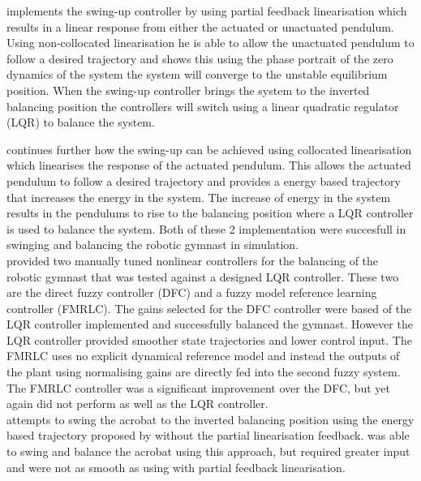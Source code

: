 \citet{spong_swingup} implements the swing-up controller by using partial feedback linearisation which results in a linear response from either the actuated or unactuated pendulum. Using non-collocated linearisation he is able to allow the unactuated pendulum to follow a desired trajectory and shows this using the phase portrait of the zero dynamics of the system the system will converge to the unstable equilibrium position. When the swing-up controller brings the system to the inverted balancing position the controllers will switch using a linear quadratic regulator (LQR) to balance the system.

\citet{spong_swingup} continues further how the swing-up can be achieved using collocated linearisation which linearises the response of the actuated pendulum. This allows the actuated pendulum to follow a desired trajectory and \citet{spong_swingup} provides a energy based trajectory that increases the energy in the system. The increase of energy in the system results in the pendulums to rise to the balancing position where a LQR controller is used to balance the system. Both of these 2 implementation were succesfull in swinging and balancing the robotic gymnast in simulation.\\

\citet{Brown1997} provided two manually tuned nonlinear controllers for the balancing of the robotic gymnast that was tested against a designed LQR controller. These two are the direct fuzzy controller (DFC) and a fuzzy model reference learning controller (FMRLC). The gains selected for the DFC controller were based of the LQR controller implemented and successfully balanced the gymnast. However the LQR controller provided smoother state trajectories and lower control input. The FMRLC uses no explicit dynamical reference model and instead the outputs of the plant using normalising gains are directly fed into the second fuzzy system. The FMRLC controller was a significant improvement over the DFC, but yet again did not perform as well as the LQR controller.\\

\citet{Brown1997} attempts to swing the acrobat to the inverted balancing position using the energy based trajectory proposed by \citet{spong_swingup} without the partial linearisation feedback. \citet{Brown1997} was able to swing and balance the acrobat using this approach, but required greater input and were not as smooth as using with partial feedback linearisation.\\

